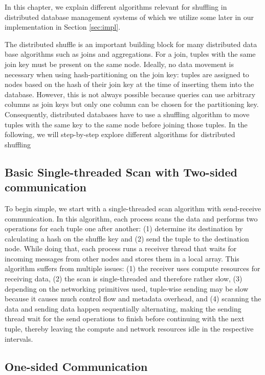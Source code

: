 
In this chapter, we explain different algorithms relevant for shuffling in distributed database management systems of which we utilize some later in our implementation in Section \ref{sec:impl}.

The distributed shuffle is an important building block for many distributed data base algorithms such as joins and aggregations.
For a join, tuples with the same join key must be present on the same node.
Ideally, no data movement is necessary when using hash-partitioning on the join key: tuples are assigned to nodes based on the hash of their join key at the time of inserting them into the database.
However, this is not always possible because queries can use arbitrary columns as join keys but only one column can be chosen for the partitioning key.
Consequently, distributed databases have to use a shuffling algorithm to move tuples with the same key to the same node before joining those tuples.
In the following, we will step-by-step explore different algorithms for distributed shuffling

\subsection{Basic Single-threaded Scan with Two-sided communication}

To begin simple, we start with a single-threaded scan algorithm with send-receive communication.
In this algorithm, each process scans the data and performs two operations for each tuple one after another:
(1) determine its destination by calculating a hash on the shuffle key and
(2) send the tuple to the destination node.
While doing that, each process runs a receiver thread that waits for incoming messages from other nodes and stores them in a local array.
This algorithm suffers from multiple issues:
(1) the receiver uses compute resources for receiving data,
(2) the scan is single-threaded and therefore rather slow,
(3) depending on the networking primitives used, tuple-wise sending may be slow because it causes much control flow and metadata overhead,
and (4) scanning the data and sending data happen sequentially alternating, making the sending thread wait for the send operations to finish before continuing with the next tuple, thereby leaving the compute and network resources idle in the respective intervals.

\subsection{One-sided Communication}
\label{sec:shuffle:single-thread-one-sided}

